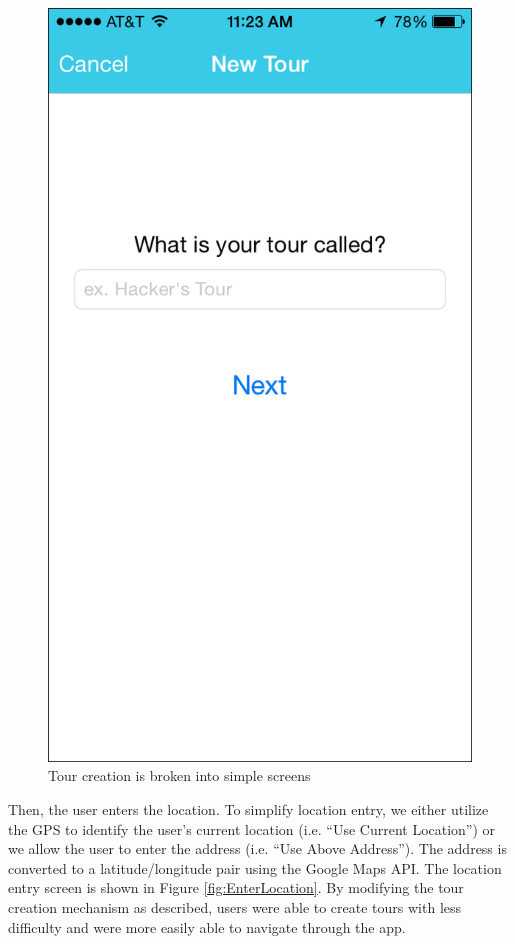 \documentclass{sigchi}
\begin{document}
\begin{figure}
\centering
\includegraphics[width=0.7\linewidth]{./TourName}
\caption{Tour creation is broken into simple screens}
\label{fig:TourName}
\end{figure}

Then, the user enters the location. To simplify location entry, we either utilize the GPS to identify the user's current location (i.e. ``Use Current Location'') or we allow the user to enter the address (i.e. ``Use Above Address''). The address is converted to a latitude/longitude pair using the Google Maps API. The location entry screen is shown in  Figure \ref{fig:EnterLocation}. By modifying the tour creation mechanism as described, users were able to create tours with less difficulty and were more easily able to navigate through the app.
\end{document}
